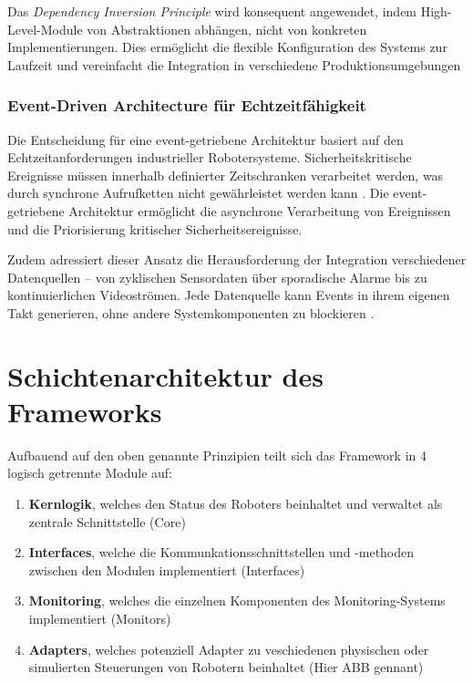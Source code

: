 Das \textit{Dependency Inversion Principle} wird konsequent angewendet, indem
High-Level-Module von Abstraktionen abhängen, nicht von konkreten
Implementierungen. Dies ermöglicht die flexible Konfiguration des Systems zur
Laufzeit und vereinfacht die Integration in verschiedene Produktionsumgebungen

\subsubsection{Event-Driven Architecture für Echtzeitfähigkeit}
Die Entscheidung für eine event-getriebene Architektur basiert auf den
Echtzeitanforderungen industrieller Robotersysteme. Sicherheitskritische
Ereignisse müssen innerhalb definierter Zeitschranken verarbeitet werden, was
durch synchrone Aufrufketten nicht gewährleistet werden kann
. Die event-getriebene Architektur ermöglicht die
asynchrone Verarbeitung von Ereignissen und die Priorisierung kritischer
Sicherheitsereignisse.

Zudem adressiert dieser Ansatz die Herausforderung der Integration verschiedener
Datenquellen – von zyklischen Sensordaten über sporadische Alarme bis zu
kontinuierlichen Videoströmen. Jede Datenquelle kann Events in ihrem eigenen
Takt generieren, ohne andere Systemkomponenten zu blockieren
.

\section{Schichtenarchitektur des Frameworks}

Aufbauend auf den oben genannte Prinzipien
teilt sich das Framework in 4 logisch getrennte Module auf:

\begin{enumerate}
	\item \textbf{Kernlogik}, welches den Status des Roboters beinhaltet und
	      verwaltet als zentrale Schnittstelle (Core)\item \textbf{Interfaces},
	      welche die Kommunkationsschnittstellen und -methoden zwischen den Modulen
	      implementiert (Interfaces) \item \textbf{Monitoring}, welches die einzelnen
	      Komponenten des Monitoring-Systems implementiert (Monitors) \item
	      \textbf{Adapters}, welches potenziell Adapter zu veschiedenen physischen oder
	      simulierten Steuerungen von Robotern beinhaltet (Hier ABB gennant)
\end{enumerate}



